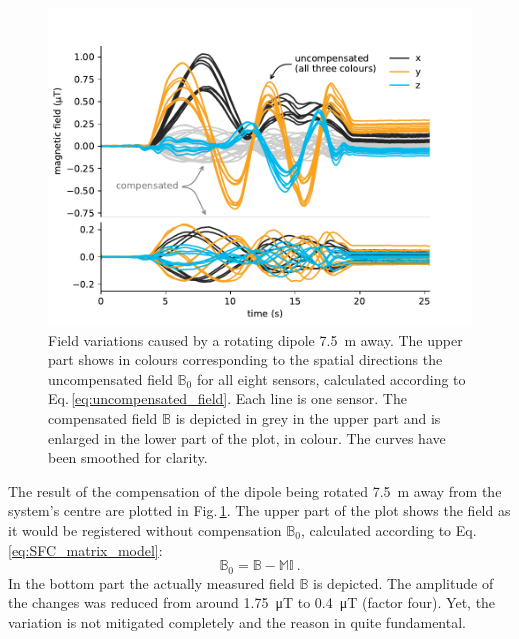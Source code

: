 \begin{figure}
  \centering
  \includegraphics[width=.8\linewidth]{gfx/prototype/compensated_7_5m_double.pdf}
  \caption{Field variations caused by a rotating dipole \SI{7.5}{\meter} away.
  The upper part shows in colours corresponding to the spatial directions the uncompensated field $\mathbb{B}_0$ for all eight sensors, calculated according to Eq.\,\ref{eq:uncompensated_field}. Each line is one sensor. The compensated field $\mathbb{B}$ is depicted in grey in the upper part and is enlarged in the lower part of the plot, in colour. The curves have been smoothed for clarity.}\label{fig:prototype_compensation_time}
\end{figure}

The result of the compensation of the dipole being rotated \SI{7.5}{\meter} away from the system's centre are plotted in Fig.\,\ref{fig:prototype_compensation_time}. The upper part of the plot shows the field as it would be registered without compensation $\mathbb{B}_0$, calculated according to Eq.\,\ref{eq:SFC_matrix_model}:
\begin{equation}
  \label{eq:uncompensated_field}
  \mathbb{B}_0 = \mathbb{B} - \mathbb{M} \mathbb{I} \ .
\end{equation}
In the bottom part the actually measured field $\mathbb{B}$ is depicted. The amplitude of the changes was reduced from around \SI{1.75}{\micro\tesla} to \SI{0.4}{\micro\tesla} (factor four). Yet, the variation is not mitigated completely and the reason in quite fundamental.

